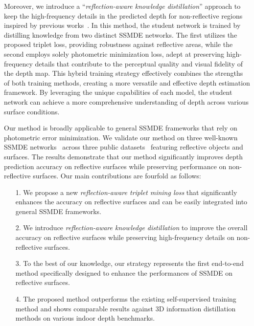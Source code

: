 Moreover, we introduce a ``\textit{reflection-aware knowledge distillation}'' approach to keep the high-frequency details in the predicted depth for non-reflective regions inspired by previous works~\citep{shi20233d}. 
In this method, the student network is trained by distilling knowledge from two distinct SSMDE networks.
The first utilizes the proposed triplet loss, providing robustness against reflective areas, while the second employs solely photometric minimization loss, adept at preserving high-frequency details that contribute to the perceptual quality and visual fidelity of the depth map.
This hybrid training strategy effectively combines the strengths of both training methods, creating a more versatile and effective depth estimation framework.
By leveraging the unique capabilities of each model, the student network can achieve a more comprehensive understanding of depth across various surface conditions.

Our method is broadly applicable to general SSMDE frameworks that rely on photometric error minimization.
We validate our method on three well-known SSMDE networks~\citep{godard2019digging, lyu2021hr, zhao2022monovit} across three public datasets~\citep{dai2017scannet, shotton2013scene, ramirez2023booster} featuring reflective objects and surfaces. The results demonstrate that our method significantly improves depth prediction accuracy on reflective surfaces while preserving performance on non-reflective surfaces.
Our main contributions are fourfold as follows:
\begin{itemize}[leftmargin=15pt]
    \item[1.] We propose a new \textit{reflection-aware triplet mining loss} that significantly enhances the accuracy on reflective surfaces and can be easily integrated into general SSMDE frameworks.
    \item[2.] We introduce \textit{reflection-aware knowledge distillation} to improve the overall accuracy on reflective surfaces while preserving high-frequency details on non-reflective surfaces.
    \item[3.] To the best of our knowledge, our strategy represents the first end-to-end method specifically designed to enhance the performances of SSMDE on reflective surfaces.
    \item[4.] The proposed method outperforms the existing self-supervised training method and shows comparable results against 3D information distillation methods on various indoor depth benchmarks.
\end{itemize}

